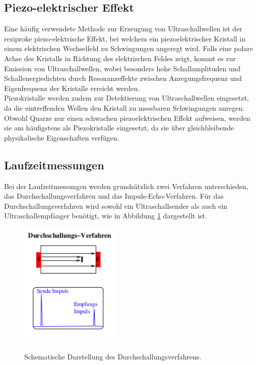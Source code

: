 \subsection{Piezo-elektrischer Effekt}
Eine häufig verwendete Methode zur Erzeugung von Ultraschallwellen ist der reziproke piezo-elektrische Effekt,
bei welchem ein piezoelektrischer Kristall in einem elektrischen
Wechselfeld zu Schwingungen angeregt wird. Falls eine polare Achse des Kristalls in
Richtung des elektrischen Feldes zeigt, kommt es zur Emission von Ultraschallwellen,
wobei besonders hohe Schallamplituden und Schallenergiedichten durch Resonanzeffekte
zwischen Anregungsfrequenz und Eigenfrequenz der Kristalle erreicht werden.
\\
Piezokristalle werden zudem zur Detektierung von Ultraschallwellen eingesetzt,
da die eintreffenden Wellen den Kristall zu messbaren Schwingungen anregen.
Obwohl Quarze nur einen schwachen piezoelektrischen Effekt aufweisen, werden sie
am häufigstens als Piezokristalle eingesetzt, da sie über gleichbleibende
physikalische Eigenschaften verfügen.

\subsection{Laufzeitmessungen}

Bei der Laufzeitmessungen werden grundsätzlich zwei Verfahren unterschieden, das Durchschallungsverfahren
und das Impuls-Echo-Verfahren.
Für das Durchschallungsverfahren wird sowohl ein Ultraschallsender als auch ein Ultraschallempfänger benötigt, wie
in Abbildung \ref{fig:durch} dargestellt ist.

\begin{figure}[H]
  \centering
  \includegraphics[height=6cm]{durch.png}
  \caption{Schematische Darstellung des Durchschallungsverfahrens.}
  \label{fig:durch}
  \cite{skript}
\end{figure}

